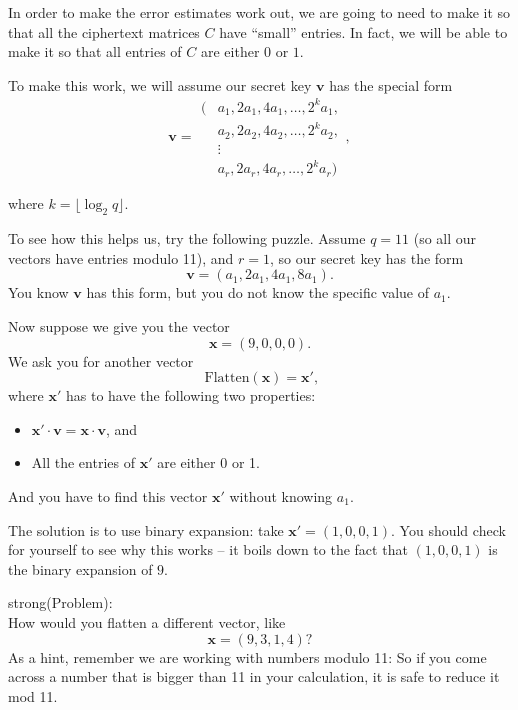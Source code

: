In order to make the error estimates work out, we are going to need to
make it so that all the ciphertext matrices \(C\) have ``small''
entries. In fact, we will be able to make it so that all entries of
\(C\) are either \(0\) or \(1\).

To make this work, we will assume our secret key \(\mathbf{v}\) has the
special form \[\mathbf{v} = \left. \begin{aligned}
( & a_{1},2a_{1},4a_{1},\ldots,2^{k}a_{1}, \\
 & a_{2},2a_{2},4a_{2},\ldots,2^{k}a_{2}, \\
 & \vdots \\
 & a_{r},2a_{r},4a_{r},\ldots,2^{k}a_{r})
\end{aligned} \right.,\] \label{fhe-v-form}{}

where \(k = \lfloor\log_{2}q\rfloor\).

To see how this helps us, try the following puzzle. Assume \(q = 11\)
(so all our vectors have entries modulo 11), and \(r = 1\), so our
secret key has the form
\[\mathbf{v} = \left( a_{1},2a_{1},4a_{1},8a_{1} \right).\] You know
\(\mathbf{v}\) has this form, but you do not know the specific value of
\(a_{1}\).

Now suppose we give you the vector \[\mathbf{x} = (9,0,0,0).\] We ask
you for another vector
\[\text{ Flatten}\left( \mathbf{x} \right) = \mathbf{x}',\] where
\(\mathbf{x}'\) has to have the following two properties:

\begin{itemize}
\item
  \(\mathbf{x}' \cdot \mathbf{v} = \mathbf{x} \cdot \mathbf{v}\), and
\item
  All the entries of \(\mathbf{x}'\) are either 0 or 1.
\end{itemize}

And you have to find this vector \(\mathbf{x}'\) without knowing
\(a_{1}\).

The solution is to use binary expansion: take
\(\mathbf{x}' = (1,0,0,1)\). You should check for yourself to see why
this works -- it boils down to the fact that \((1,0,0,1)\) is the binary
expansion of \(9\).

strong(Problem):\\
How would you flatten a different vector, like
\[\mathbf{x} = (9,3,1,4)?\] As a hint, remember we are working with
numbers modulo 11: So if you come across a number that is bigger than 11
in your calculation, it is safe to reduce it mod 11.

